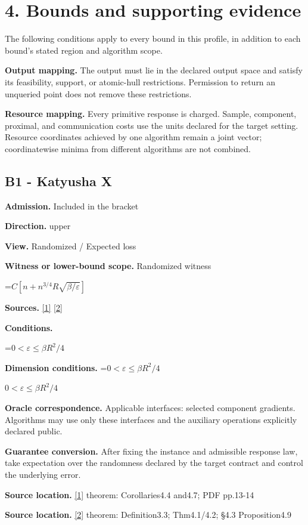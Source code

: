 \documentclass[10pt,a4paper]{article}
\newcommand{\AtlasMath}[1]{\par\begingroup\centering\setbox0=\hbox{$\displaystyle #1$}\ifdim\wd0>1.4\linewidth\typeout{ATLAS WIDE FORMULA: \the\wd0}\fi\ifdim\wd0>\linewidth\resizebox{\linewidth}{!}{\box0}\else\box0\fi\par\endgroup}
\newcommand{\AtlasInlineMath}[1]{\begingroup\setbox0=\hbox{$#1$}\ifdim\wd0>.4\linewidth\endgroup\AtlasMath{#1}\else\endgroup$#1$\fi}
\begin{document}
\section{4. Bounds and supporting evidence}
The following conditions apply to every bound in this profile, in addition to each bound's stated region and algorithm scope.

\textbf{Output mapping.} The output must lie in the declared output space and satisfy its feasibility, support, or atomic-hull restrictions. Permission to return an unqueried point does not remove these restrictions.

\textbf{Resource mapping.} Every primitive response is charged. Sample, component, proximal, and communication costs use the units declared for the target setting. Resource coordinates achieved by one algorithm remain a joint vector; coordinatewise minima from different algorithms are not combined.

\subsection{B1 - Katyusha X}
\textbf{Admission.} Included in the bracket

\textbf{Direction.} upper

\textbf{View.} Randomized / Expected loss

\textbf{Witness or lower-bound scope.} Randomized witness

\AtlasMath{C[n+n^{3/4}R\sqrt{\beta/\varepsilon}]}
\textbf{Sources.} \href{https://arxiv.org/pdf/1802.03866}{[1]} \href{https://proceedings.mlr.press/v97/zhou19b/zhou19b.pdf}{[2]}

\textbf{Conditions.} 
\AtlasMath{0<\varepsilon\le\beta R^2/4}


\textbf{Dimension conditions.} \AtlasInlineMath{0<\varepsilon\le\beta R^2/4}

\textbf{Oracle correspondence.} Applicable interfaces: selected component gradients. Algorithms may use only these interfaces and the auxiliary operations explicitly declared public.

\textbf{Guarantee conversion.} After fixing the instance and admissible response law, take expectation over the randomness declared by the target contract and control the underlying error.

\textbf{Source location.} \href{https://arxiv.org/pdf/1802.03866}{[1]} theorem: Corollaries4.4 and4.7; PDF pp.13-14

\textbf{Source location.} \href{https://proceedings.mlr.press/v97/zhou19b/zhou19b.pdf}{[2]} theorem: Definition3.3; Thm4.1/4.2; §4.3 Proposition4.9
\end{document}
